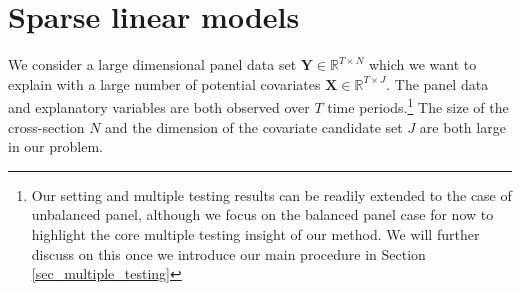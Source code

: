 \documentclass[11pt]{article}
\newcommand{\RR}{\mathbb{R}}
\def\cmt#1{{\textcolor{red}{(#1)}}}
\begin{document}
	
	
	\section{Sparse linear models}\label{sec:model}
	
	
	
	We consider a large dimensional panel data set $\bm{Y} \in \RR^{T\times N}$ which we want to explain with a large number of potential covariates $\bm{X} \in \RR^{T\times J}$. The panel data and explanatory variables are both observed over $T$ time periods.\footnote{Our setting and multiple testing results can be readily extended to the case of unbalanced panel, although we focus on the balanced panel case for now to highlight the core multiple testing insight of our method. We will further discuss on this once we introduce our main procedure in Section \ref{sec_multiple_testing}} The size of the cross-section $N$ and the dimension of the covariate candidate set $J$ are both large in our problem. %
	
\end{document}
